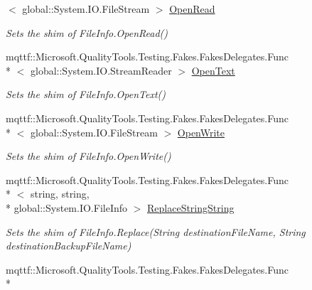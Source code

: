 \begin{DoxyCompactItemize}
$<$ global\-::\-System.\-I\-O.\-File\-Stream $>$ \hyperlink{class_system_1_1_i_o_1_1_fakes_1_1_shim_file_info_ab3d6121ee5f9a29a8a6219d25783750f}{Open\-Read}
\begin{DoxyCompactList}\small\item\em Sets the shim of File\-Info.\-Open\-Read()\end{DoxyCompactList}\item 
mqttf\-::\-Microsoft.\-Quality\-Tools.\-Testing.\-Fakes.\-Fakes\-Delegates.\-Func\\*
$<$ global\-::\-System.\-I\-O.\-Stream\-Reader $>$ \hyperlink{class_system_1_1_i_o_1_1_fakes_1_1_shim_file_info_ad329c72f6f7c5c7f2ce382c012a78ecf}{Open\-Text}
\begin{DoxyCompactList}\small\item\em Sets the shim of File\-Info.\-Open\-Text()\end{DoxyCompactList}\item 
mqttf\-::\-Microsoft.\-Quality\-Tools.\-Testing.\-Fakes.\-Fakes\-Delegates.\-Func\\*
$<$ global\-::\-System.\-I\-O.\-File\-Stream $>$ \hyperlink{class_system_1_1_i_o_1_1_fakes_1_1_shim_file_info_a7f1b5a79fff814e98c4c6592c77099ed}{Open\-Write}
\begin{DoxyCompactList}\small\item\em Sets the shim of File\-Info.\-Open\-Write()\end{DoxyCompactList}\item 
mqttf\-::\-Microsoft.\-Quality\-Tools.\-Testing.\-Fakes.\-Fakes\-Delegates.\-Func\\*
$<$ string, string, \\*
global\-::\-System.\-I\-O.\-File\-Info $>$ \hyperlink{class_system_1_1_i_o_1_1_fakes_1_1_shim_file_info_a05fd51d578a82665c791b10432a80f15}{Replace\-String\-String}
\begin{DoxyCompactList}\small\item\em Sets the shim of File\-Info.\-Replace(\-String destination\-File\-Name, String destination\-Backup\-File\-Name)\end{DoxyCompactList}\item 
mqttf\-::\-Microsoft.\-Quality\-Tools.\-Testing.\-Fakes.\-Fakes\-Delegates.\-Func\\*

\end{DoxyCompactItemize}

